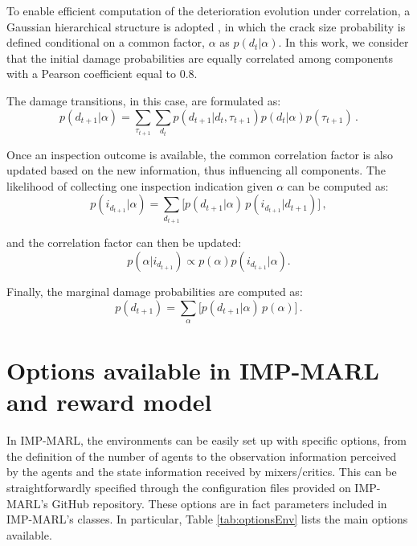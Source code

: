 To enable efficient computation of the deterioration evolution under correlation, a Gaussian hierarchical structure is adopted \citep{morato2022syst}, in which the crack size probability is defined conditional on a common factor, $\alpha$ as $p(d_{t}|\alpha)$. In this work, we consider that the initial damage probabilities are equally correlated among components with a Pearson coefficient equal to 0.8. 

The damage transitions, in this case, are formulated as: 
\begin{equation} \label{eq:ex_pod4}
    p(d_{t+1}|\alpha) =  \sum_{\tau_{t+1}} \sum_{d_t} p(d_{t+1}|d_t,\tau_{t+1}) p(d_{t}|\alpha) p(\tau_{t+1}) \, .
\end{equation}

Once an inspection outcome is available, the common correlation factor is also updated based on the new information, thus influencing all components. The likelihood of collecting one inspection indication given $\alpha$ can be computed as:
\begin{equation}\label{Eq:margHyp}
p(i_{d_{t+1}}|\alpha)=\sum_{d_{t+1}} \Big[p(d_{t+1}|\alpha)\,p(i_{d_{t+1}}|d_{t+1})\Big] \, ,
\end{equation}

and the correlation factor can then be updated:
\begin{equation}\label{Eq:infHyp}
p(\alpha|i_{d_{t+1}}) \propto p(\alpha)p(i_{d_{t+1}}|\alpha) .
\end{equation}

Finally, the marginal damage probabilities are computed as:
\begin{equation}\label{Eq:margBel}
p(d_{t+1}) = \sum_{\alpha} \Big[p(d_{t+1}|\alpha)\, p({\alpha}) \Big] \, .
\end{equation}

\section{Options available in IMP-MARL and reward model} 
\label{App:envir}
In IMP-MARL, the environments can be easily set up with specific options, from the definition of the number of agents to the observation information perceived by the agents and the state information received by mixers/critics. This can be straightforwardly specified through the configuration files provided on IMP-MARL's GitHub repository.
These options are in fact parameters included in IMP-MARL's classes.
In particular, Table \ref{tab:optionsEnv} lists the main options available.

